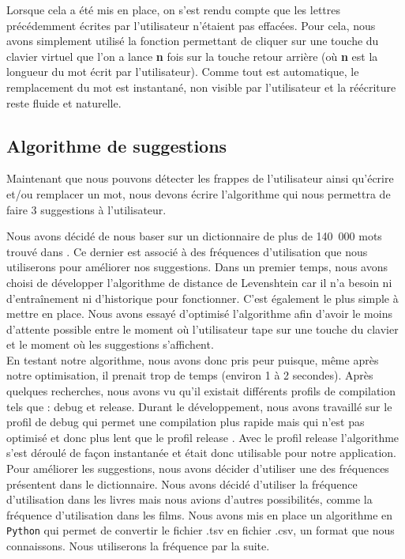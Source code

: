 \documentclass[a4paper, 11pt]{report}
\newcommand{\langage}[1]{\texttt{#1}}
\begin{document}
{Lorsque cela a été mis en place, on s'est rendu compte que les lettres précédemment écrites par l'utilisateur n'étaient pas effacées. Pour cela, nous avons simplement utilisé la fonction permettant de cliquer sur une touche du clavier virtuel que l'on a lance \textbf{n} fois sur la touche retour arrière (où \textbf{n} est la longueur du mot écrit par l'utilisateur). Comme tout est automatique, le remplacement du mot est instantané, non visible par l'utilisateur et la réécriture reste fluide et naturelle.

\subsection{Algorithme de suggestions}

Maintenant que nous pouvons détecter les frappes de l'utilisateur ainsi qu'écrire et/ou remplacer un mot, nous devons écrire l'algorithme qui nous permettra de faire 3 suggestions à l'utilisateur.\par \vspace{\baselineskip}

Nous avons décidé de nous baser sur un dictionnaire de plus de 140~000 mots trouvé dans \cite{new2019lexique}. Ce dernier est associé à des fréquences d'utilisation que nous utiliserons pour améliorer nos suggestions. Dans un premier temps, nous avons choisi de développer l'algorithme de distance de Levenshtein car il n'a besoin ni d'entraînement ni d'historique pour fonctionner. C'est également le plus simple à mettre en place. Nous avons essayé d'optimisé l'algorithme afin d'avoir le moins d'attente possible entre le moment où l'utilisateur tape sur une touche du clavier et le moment où les suggestions s'affichent. \\

En testant notre algorithme, nous avons donc pris peur puisque, même après notre optimisation, il prenait trop de temps (environ 1 à 2 secondes). Après quelques recherches, nous avons vu qu'il existait  différents profils de compilation tels que : \og debug \fg{} et \og release\fg{}. Durant le développement, nous avons travaillé sur le profil de \og debug \fg{} qui permet une compilation plus rapide mais qui n'est pas optimisé et donc plus lent que le profil \og release \fg. Avec le profil \og release \fg{} l'algorithme s'est déroulé de façon instantanée et était donc utilisable pour notre application.\\

Pour améliorer les suggestions, nous avons décider d'utiliser une des fréquences présentent dans le dictionnaire. Nous avons décidé d'utiliser la fréquence d'utilisation dans les livres mais nous avions d'autres possibilités, comme la fréquence d'utilisation dans les films. Nous avons mis en place un algorithme en \langage{Python} qui permet de convertir le fichier .tsv en fichier .csv, un format que nous connaissons. Nous utiliserons la fréquence par la suite. \\

}
\end{document}
